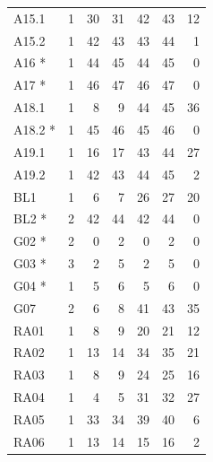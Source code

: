 \begin{table}[H]
\begin{minipage}[t]{.46\linewidth}
\begin{tabular*}{\linewidth}{@{\extracolsep{\fill}}lrrrrrr@{}}
\midrule
A15.1 & 1 & 30 & 31 & 42 & 43 & 12 \\
A15.2 & 1 & 42 & 43 & 43 & 44 & 1 \\
A16 * & 1 & 44 & 45 & 44 & 45 & 0 \\
A17 * & 1 & 46 & 47 & 46 & 47 & 0 \\
A18.1 & 1 & 8 & 9 & 44 & 45 & 36 \\
A18.2 * & 1 & 45 & 46 & 45 & 46 & 0 \\
A19.1 & 1 & 16 & 17 & 43 & 44 & 27 \\
A19.2 & 1 & 42 & 43 & 44 & 45 & 2 \\
BL1 & 1 & 6 & 7 & 26 & 27 & 20 \\
BL2 * & 2 & 42 & 44 & 42 & 44 & 0 \\
G02 * & 2 & 0 & 2 & 0 & 2 & 0 \\
G03 * & 3 & 2 & 5 & 2 & 5 & 0 \\
G04 * & 1 & 5 & 6 & 5 & 6 & 0 \\
G07 & 2 & 6 & 8 & 41 & 43 & 35 \\
RA01 & 1 & 8 & 9 & 20 & 21 & 12 \\
RA02 & 1 & 13 & 14 & 34 & 35 & 21 \\
RA03 & 1 & 8 & 9 & 24 & 25 & 16 \\
RA04 & 1 & 4 & 5 & 31 & 32 & 27 \\
RA05 & 1 & 33 & 34 & 39 & 40 & 6 \\
RA06 & 1 & 13 & 14 & 15 & 16 & 2 \\
\bottomrule
\end{tabular*}
\end{minipage}
\endgroup
\end{table}
